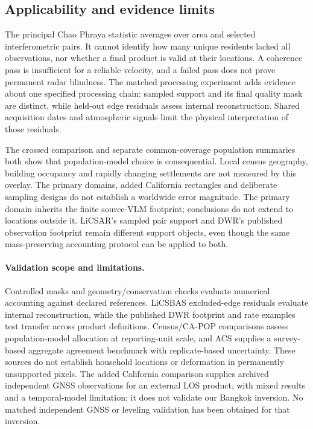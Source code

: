 \documentclass[pdflatex,sn-nature]{sn-jnl}
\begin{document}
\subsection{Applicability and evidence limits}
The principal Chao Phraya statistic averages over area and selected interferometric pairs. It cannot identify how many unique residents lacked all observations, nor whether a final product is valid at their locations. A coherence pass is insufficient for a reliable velocity, and a failed pass does not prove permanent radar blindness. The matched processing experiment adds evidence about one specified processing chain: sampled support and its final quality mask are distinct, while held-out edge residuals assess internal reconstruction. Shared acquisition dates and atmospheric signals limit the physical interpretation of those residuals.

The crossed comparison and separate common-coverage population summaries both show that population-model choice is consequential. Local census geography, building occupancy and rapidly changing settlements are not measured by this overlay. The primary domains, added California rectangles and deliberate sampling designs do not establish a worldwide error magnitude. The primary domain inherits the finite source-VLM footprint; conclusions do not extend to locations outside it. LiCSAR's sampled pair support and DWR's published observation footprint remain different support objects, even though the same mass-preserving accounting protocol can be applied to both.

\paragraph{Validation scope and limitations.} Controlled masks and geometry/conservation checks evaluate numerical accounting against declared references. LiCSBAS excluded-edge residuals evaluate internal reconstruction, while the published DWR footprint and rate examples test transfer across product definitions. Census/CA-POP comparisons assess population-model allocation at reporting-unit scale, and ACS supplies a survey-based aggregate agreement benchmark with replicate-based uncertainty. These sources do not establish household locations or deformation in permanently unsupported pixels. The added California comparison supplies archived independent GNSS observations for an external LOS product, with mixed results and a temporal-model limitation; it does not validate our Bangkok inversion. No matched independent GNSS or leveling validation has been obtained for that inversion.
\end{document}
